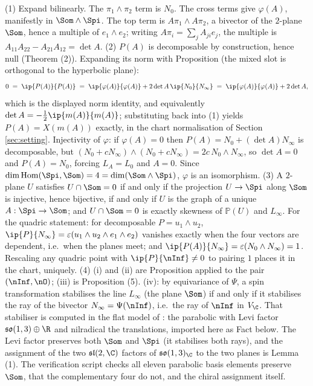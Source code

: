 (1) Expand bilinearly. The $\pi_1\wedge\pi_2$ term is $N_0$. The cross terms give $\varphi(A)$, manifestly in $\Som\wedge\Spi$. The top term is $A\pi_1\wedge A\pi_2$, a bivector of the $2$-plane $\Som$, hence a multiple of $e_1\wedge e_2$; writing $A\pi_i = \sum_j A_{ji}e_j$, the multiple is $A_{11}A_{22} - A_{21}A_{12} = \det A$.
(2) $P(A)$ is decomposable by construction, hence null (Theorem (2)). Expanding its norm with Proposition  (the mixed slot is orthogonal to the hyperbolic plane):
\[
0 \;=\; \ip{P(A)}{P(A)} \;=\; \ip{\varphi(A)}{\varphi(A)} + 2\det A\,\ip{N_0}{N_\infty}
 \;=\; \ip{\varphi(A)}{\varphi(A)} + 2\det A ,
\]
which is the displayed norm identity, and equivalently $\det A = -\tfrac12\ip{m(A)}{m(A)}$; substituting back into (1) yields $P(A) = X(m(A))$ exactly, in the chart normalisation of Section \ref{sec:setting}. Injectivity of $\varphi$: if $\varphi(A) = 0$ then $P(A) = N_0 + (\det A)N_\infty$ is decomposable, but $(N_0 + cN_\infty)\wedge(N_0 + cN_\infty) = 2c\,N_0\wedge N_\infty$, so $\det A = 0$ and $P(A) = N_0$, forcing $L_A = L_0$ and $A = 0$. Since $\dim \operatorname{Hom}(\Spi,\Som) = 4 = \dim(\Som\wedge\Spi)$, $\varphi$ is an isomorphism.
(3) A $2$-plane $U$ satisfies $U \cap \Som = 0$ if and only if the projection $U \to \Spi$ along $\Som$ is injective, hence bijective, if and only if $U$ is the graph of a unique $A: \Spi \to \Som$; and $U \cap \Som = 0$ is exactly skewness of $\mathbb{P}(U)$ and $L_\infty$. For the quadric statement: for decomposable $P = u_1\wedge u_2$, $\ip{P}{N_\infty} = \varepsilon(u_1\wedge u_2\wedge e_1\wedge e_2)$ vanishes exactly when the four vectors are dependent, i.e.\ when the planes meet; and $\ip{P(A)}{N_\infty} = \varepsilon(N_0\wedge N_\infty) = 1$. Rescaling any quadric point with $\ip{P}{\nInf} \neq 0$ to pairing $1$ places it in the chart, uniquely.
(4) (i) and (ii) are Proposition  applied to the pair $(\nInf, \nO)$; (iii) is Proposition (5). (iv): by equivariance of $\Psi$, a spin transformation stabilises the line $L_\infty$ (the plane $\Som$) if and only if it stabilises the ray of the bivector $N_\infty = \Psi(\nInf)$, i.e.\ the ray of $\nInf$ in $V_\C$. That stabiliser is computed in the flat model of \cite{ButlerT6}: the parabolic with Levi factor $\mathfrak{so}(1,3)\oplus\R$ and nilradical the translations, imported here as Fact  below. The Levi factor preserves both $\Som$ and $\Spi$ (it stabilises both rays), and the assignment of the two $\mathfrak{sl}(2,\C)$ factors of $\mathfrak{so}(1,3)_\C$ to the two planes is Lemma (1). The verification script checks all eleven parabolic basis elements preserve $\Som$, that the complementary four do not, and the chiral assignment itself.
